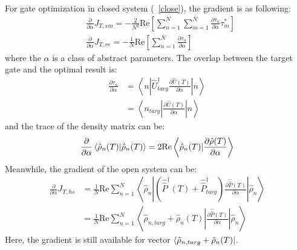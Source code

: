 For gate optimization in closed system (~\ref{close}), the gradient is as following:
\begin{equation}
\begin{split}
    &\frac{\partial}{\partial \alpha}J_{T,sm}=-\frac{2}{N^{2}}\mathrm{Re}\left[\sum_{n=1}^{N}\sum_{m=1}^{N}\frac{\partial \tau_{n}}{\partial \alpha}\tau^{*}_{m}\right]\\
    &\frac{\partial}{\partial \alpha}J_{T,re}=-\frac{1}{N}\mathrm{Re}\left[\sum_{n=1}^{N}\frac{\partial \tau_{n}}{\partial \alpha}\right]
\end{split}
\end{equation}
where the $\alpha$ is a class of abstract parameters. The overlap between the target gate and the optimal result is:
\begin{equation}
    \begin{split}
        \frac{\partial \tau_{n}}{\partial \alpha}&=\left<n\left|\hat{U}^{\dagger}_{targ}\frac{\partial\hat{U}(T)}{\partial \alpha}\right|n\right>\\
        &=\left<n_{targ}\left|\frac{\partial \hat{U}(T)}{\partial \alpha}\right|n\right>
    \end{split}
\end{equation}
and the trace of the density matrix can be:
\begin{equation}
    \begin{split}
        \frac{\partial}{\partial \alpha}\braket{\hat{\rho}_{n}(T)|\hat{\rho}_{n}(T)}=2\mathrm{Re}\left<\hat{\rho}_{n}(T)|\frac{\partial \hat{\rho}(T)}{\partial \alpha}\right>
    \end{split}
    \label{overlap}
\end{equation}
Meanwhile, the gradient of the open system can be:
\begin{equation}
    \begin{split}
        \frac{\partial}{\partial \alpha}J_{T,hs}&=\frac{1}{N}\mathrm{Re}\sum_{n=1}^{N}\left<\hat{\rho}_{n}\left|\left(\hat{\hat{P}}^{\dagger}(T)+\hat{\hat{P}}^{\dagger}_{targ}\right)\frac{\partial \hat{\hat{P}}(T)}{\partial \alpha}\right|\hat{\rho}_{n}\right>\\
        &=\frac{1}{N}\mathrm{Re}\sum_{n=1}^{N}\left<\hat{\rho}_{n,targ}+\hat{\rho}_{n}(T)\left|\frac{\partial\hat{\hat{P}}(T)}{\partial \alpha}\right|\hat{\rho}_{n}\right>
    \end{split}
\end{equation}
Here, the gradient is still available for vector $\bra{\hat{\rho}_{n,targ}+\hat{\rho}_{n}(T)}$.

